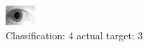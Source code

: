 \begin{figure}[h!]
\begin{center}
\includegraphics[width=0.60\columnwidth]{figures/ID1801_class_4_target_3.png}
\end{center}
\caption{ Classification: 4 actual target: 3}
\label{fig:ID1801_class_4_target_3}
\end{figure}

